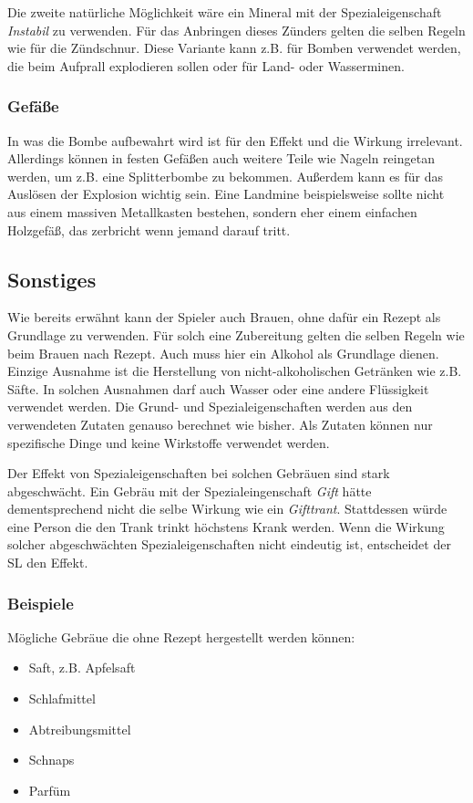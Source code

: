 Die zweite natürliche Möglichkeit wäre ein Mineral mit der Spezialeigenschaft \textit{Instabil} zu verwenden. Für das Anbringen dieses Zünders gelten die selben Regeln wie für die Zündschnur. Diese Variante kann z.B. für Bomben verwendet werden, die beim Aufprall explodieren sollen oder für Land- oder Wasserminen.

\subsubsection{Gefäße}
In was die Bombe aufbewahrt wird ist für den Effekt und die Wirkung irrelevant. Allerdings können in festen Gefäßen auch weitere Teile wie Nageln reingetan werden, um z.B. eine Splitterbombe zu bekommen. Außerdem kann es für das Auslösen der Explosion wichtig sein. Eine Landmine beispielsweise sollte nicht aus einem massiven Metallkasten bestehen, sondern eher einem einfachen Holzgefäß, das zerbricht wenn jemand darauf tritt.

\subsection{Sonstiges}
Wie bereits erwähnt kann der Spieler auch Brauen, ohne dafür ein Rezept als Grundlage zu verwenden. Für solch eine Zubereitung gelten die selben Regeln wie beim Brauen nach Rezept. Auch muss hier ein Alkohol als Grundlage dienen. Einzige Ausnahme ist die Herstellung von nicht-alkoholischen Getränken wie z.B. Säfte. In solchen Ausnahmen darf auch Wasser oder eine andere Flüssigkeit verwendet werden. Die Grund- und Spezialeigenschaften werden aus den verwendeten Zutaten genauso berechnet wie bisher. Als Zutaten können nur spezifische Dinge und keine Wirkstoffe verwendet werden.

Der Effekt von Spezialeigenschaften bei solchen Gebräuen sind stark abgeschwächt. Ein Gebräu mit der Spezialeingenschaft \textit{Gift} hätte dementsprechend nicht die selbe Wirkung wie ein \textit{Gifttrant}. Stattdessen würde eine Person die den Trank trinkt höchstens Krank werden. Wenn die Wirkung solcher abgeschwächten Spezialeigenschaften nicht eindeutig ist, entscheidet der SL den Effekt.

\subsubsection{Beispiele}
Mögliche Gebräue die ohne Rezept hergestellt werden können: 
\begin{itemize}
	\item Saft, z.B. Apfelsaft
	\item Schlafmittel
	\item Abtreibungsmittel
	\item Schnaps
	\item Parfüm
\end{itemize}


